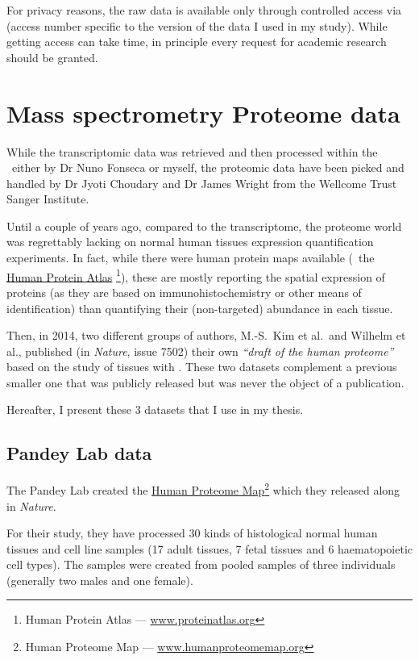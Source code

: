 For privacy reasons, the raw data is available only through controlled access via
 (access number specific to the version of the data I used
in my study). While getting access can take time, in principle every request for
academic research should be granted.

\section{Mass spectrometry Proteome data}

While the transcriptomic data was retrieved and then processed within the \EBI\
either by Dr Nuno Fonseca or myself, the proteomic data have been picked and
handled by Dr Jyoti Choudary and Dr James Wright from the Wellcome Trust
Sanger Institute.

Until a couple of years ago, compared to the transcriptome, the proteome world
was regrettably lacking on normal human tissues expression quantification
experiments. In fact, while there were human protein maps available
(\eg\ the \href{www.proteinatlas}{Human Protein Atlas}%
\footnote{Human Protein Atlas --- \href{http://www.proteinatlas.org}%
{www.proteinatlas.org}}), these
are mostly reporting the spatial expression of proteins (as they are based
on immunohistochemistry or other means of identification) than quantifying
their (non-targeted) abundance in each tissue.

Then, in 2014, two different groups of authors, M.-S.\ Kim et al.\
and Wilhelm et al., published (in \textit{Nature},
issue 7502) their own \emph{``draft of the human proteome''}
based on the study of tissues with \ms. These two datasets complement a previous
smaller one that was publicly released but was never the object of a publication.

Hereafter, I present these 3 datasets that I use in my thesis.

\subsection{Pandey Lab data}

The Pandey Lab  created the
\href{http://www.humanproteomemap.org/}%
{Human Proteome Map}\footnote{Human Proteome Map --- %
\href{http://www.humanproteomemap.org/}{www.humanproteomemap.org}} which
they released along \paper{\citetitle{PandeyData}} in \emph{Nature}.

For their study, they have processed 30 kinds of histological normal human
tissues and cell line samples (17 adult tissues, 7 fetal tissues and 6
haematopoietic cell types). The samples were created from pooled samples of three
individuals (generally two males and one female).

